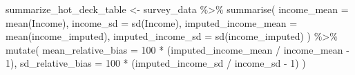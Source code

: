 \documentclass[
  spanish,
  11pt,
  letterpaper,
  oneside,
  open=any]{scrbook}
\newenvironment{Shaded}{\begin{snugshade}}{\end{snugshade}}
\newcommand{\AttributeTok}[1]{\textcolor[rgb]{0.40,0.45,0.13}{#1}}
\newcommand{\DecValTok}[1]{\textcolor[rgb]{0.68,0.00,0.00}{#1}}
\newcommand{\FunctionTok}[1]{\textcolor[rgb]{0.28,0.35,0.67}{#1}}
\newcommand{\NormalTok}[1]{\textcolor[rgb]{0.00,0.23,0.31}{#1}}
\newcommand{\OtherTok}[1]{\textcolor[rgb]{0.00,0.23,0.31}{#1}}
\newcommand{\SpecialCharTok}[1]{\textcolor[rgb]{0.37,0.37,0.37}{#1}}
\begin{document}
\begin{Shaded}
\begin{Highlighting}[]
\NormalTok{summarize\_hot\_deck\_table }\OtherTok{\textless{}{-}}\NormalTok{ survey\_data }\SpecialCharTok{\%\textgreater{}\%}
  \FunctionTok{summarise}\NormalTok{(}
    \AttributeTok{income\_mean =} \FunctionTok{mean}\NormalTok{(Income),}
    \AttributeTok{income\_sd =} \FunctionTok{sd}\NormalTok{(Income),}
    \AttributeTok{imputed\_income\_mean =} \FunctionTok{mean}\NormalTok{(income\_imputed),}
    \AttributeTok{imputed\_income\_sd =} \FunctionTok{sd}\NormalTok{(income\_imputed)}
\NormalTok{  ) }\SpecialCharTok{\%\textgreater{}\%}
  \FunctionTok{mutate}\NormalTok{(}
    \AttributeTok{mean\_relative\_bias =} \DecValTok{100} \SpecialCharTok{*}\NormalTok{ (imputed\_income\_mean }\SpecialCharTok{/}\NormalTok{ income\_mean }\SpecialCharTok{{-}} \DecValTok{1}\NormalTok{),}
    \AttributeTok{sd\_relative\_bias =} \DecValTok{100} \SpecialCharTok{*}\NormalTok{ (imputed\_income\_sd }\SpecialCharTok{/}\NormalTok{ income\_sd }\SpecialCharTok{{-}} \DecValTok{1}\NormalTok{)}
\NormalTok{  )}
\end{Highlighting}
\end{Shaded}
\end{document}
